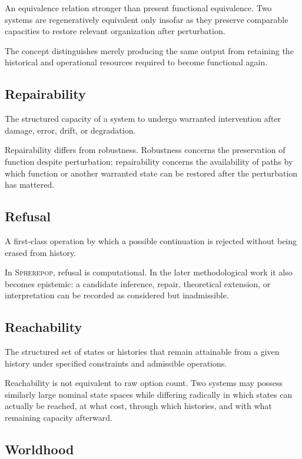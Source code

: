 \documentclass[11pt]{article}
\theoremstyle{remark}
\newcommand{\Spherepop}{\textsc{Spherepop}}
\begin{document}
An equivalence relation stronger than present functional equivalence. Two
systems are regeneratively equivalent only insofar as they preserve comparable
capacities to restore relevant organization after perturbation.

The concept distinguishes merely producing the same output from retaining the
historical and operational resources required to become functional again.

\subsection*{Repairability}

The structured capacity of a system to undergo warranted intervention after
damage, error, drift, or degradation.

Repairability differs from robustness. Robustness concerns the preservation of
function despite perturbation; repairability concerns the availability of
paths by which function or another warranted state can be restored after the
perturbation has mattered.

\subsection*{Refusal}

A first-class operation by which a possible continuation is rejected without
being erased from history.

In \Spherepop{}, refusal is computational. In the later methodological work it
also becomes epistemic: a candidate inference, repair, theoretical extension,
or interpretation can be recorded as considered but inadmissible.

\subsection*{Reachability}

The structured set of states or histories that remain attainable from a given
history under specified constraints and admissible operations.

Reachability is not equivalent to raw option count. Two systems may possess
similarly large nominal state spaces while differing radically in which states
can actually be reached, at what cost, through which histories, and with what
remaining capacity afterward.

\subsection*{Worldhood}
\end{document}
